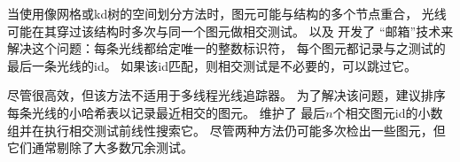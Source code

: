 当使用像网格或kd树的空间划分方法时，图元可能与结构的多个节点重合，
光线可能在其穿过该结构时多次与同一个图元做相交测试。
\citet{Arnaldi1987}以及
\citet{10.2312:egtp.19871000}开发了
“邮箱”技术来解决这个问题：每条光线都给定唯一的整数标识符，
每个图元都记录与之测试的最后一条光线的id。
如果该id匹配，则相交测试是不必要的，可以跳过它。

尽管很高效，但该方法不适用于多线程光线追踪器。
为了解决该问题，\citet{Benthin_2006}建议排序
每条光线的小哈希表以记录最近相交的图元。
\citet{shevtsov2007ray}维护了
最后$n$个相交图元id的小数组并在执行相交测试前线性搜索它。
尽管两种方法仍可能多次检出一些图元，但它们通常剔除了大多数冗余测试。
